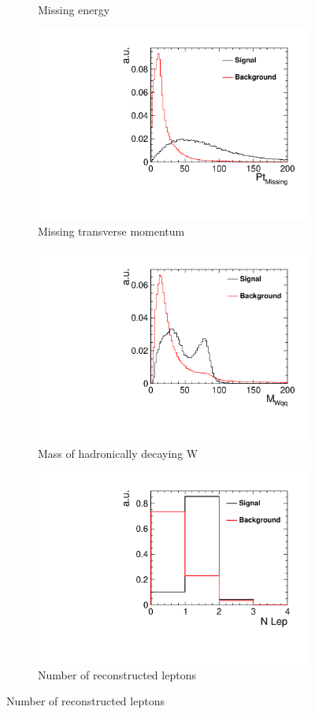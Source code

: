 \begin{figure}[ht]
\begin{subfigure}[b]{0.5\linewidth}
    \caption{Missing energy} 
  \end{subfigure}%
  \begin{subfigure}[b]{0.5\linewidth}
    \centering
    \includegraphics[width=0.75\linewidth]{Appendix/figures/MissingPt} 
    \caption{Missing transverse momentum} 
  \end{subfigure}
  \begin{subfigure}[b]{0.5\linewidth}
    \centering
    \includegraphics[width=0.75\linewidth]{Appendix/figures/MWqq} 
    \caption{Mass of hadronically decaying W} 
  \end{subfigure}%
  \begin{subfigure}[b]{0.5\linewidth}
    \centering
    \includegraphics[width=0.75\linewidth]{Appendix/figures/nLep} 
    \caption{Number of reconstructed leptons} 
  \end{subfigure}
\end{figure}

